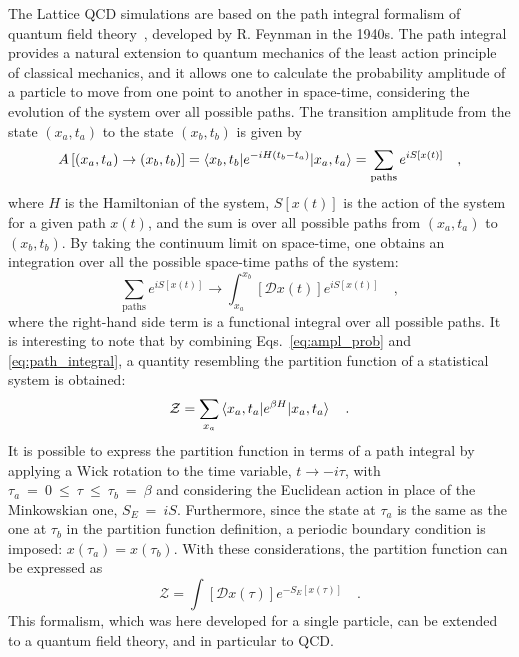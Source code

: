 The Lattice QCD simulations are based on the path integral formalism of quantum field theory~\cite{RevModPhys.20.367}, developed by R. Feynman in the 1940s. The path integral provides a natural extension to quantum mechanics of the least action principle of classical mechanics, and it allows one to calculate the probability amplitude of a particle to move from one point to another in space-time, considering the evolution of the system over all possible paths. The transition amplitude from the state $(x_a,t_a)$ to the state $(x_b,t_b)$ is given by
\begin{equation}\label{eq:ampl_prob}
  A \left[(x_a,t_a) \rightarrow (x_b,t_b) \right] = \braket{x_b,t_b | e^{-iH(t_b-t_a)} | x_a,t_a} = \sum_\mathrm{paths} e^{iS[x(t)]}\quad , 
\end{equation}
where $H$ is the Hamiltonian of the system, $S[x(t)]$ is the action of the system for a given path $x(t)$, and the sum is over all possible paths from $(x_a,t_a)$ to $(x_b,t_b)$. By taking the continuum limit on space-time, one obtains an integration over all the possible space-time paths of the system:
\begin{equation}\label{eq:path_integral}
  \sum_\mathrm{paths} e^{iS[x(t)]} \rightarrow \int_{x_a}^{x_b} \left[\mathcal{D}x(t)\right] e^{iS[x(t)]}\quad ,
\end{equation}
where the right-hand side term is a functional integral over all possible paths. It is interesting to note that by combining Eqs.~\ref{eq:ampl_prob} and \ref{eq:path_integral}, a quantity resembling the partition function of a statistical system is obtained:
\begin{equation*}
  \mathcal{Z} = \sum_{x_a} \braket{x_a,t_a | e^{\beta H} | x_a,t_a}\quad .
\end{equation*}
It is possible to express the partition function in terms of a path integral by applying a Wick rotation to the time variable, $t \rightarrow -i\tau$, with $\tau_a~=~0~\leq~\tau~\leq~\tau_b~=~\beta$ and considering the Euclidean action in place of the Minkowskian one, $S_E~=~iS$. Furthermore, since the state at $\tau_a$ is the same as the one at $\tau_b$ in the partition function definition, a periodic boundary condition is imposed: $x(\tau_a) = x(\tau_b)$. With these considerations, the partition function can be expressed as
\begin{equation*}
  \mathcal{Z} = \int \left[\mathcal{D}x(\tau)\right] e^{-S_E[x(\tau)]}\quad .
\end{equation*}
This formalism, which was here developed for a single particle, can be extended to a quantum field theory, and in particular to QCD.

